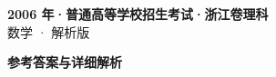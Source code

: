 \documentclass[zihao=-4, a4paper]{ctexart}
\begin{document}
\begin{center}
  {\Large\bfseries 2006 年·普通高等学校招生考试·浙江卷理科}\\[4pt]
  {\large 数学 · 解析版}
\end{center}
\medskip
{}

\clearpage
{}
\begin{center}{\Large\bfseries 参考答案与详细解析}\end{center}
\medskip

\end{document}
